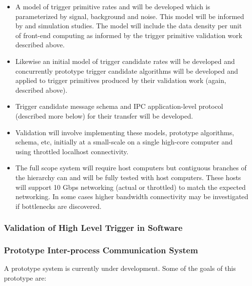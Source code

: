 \begin{itemize}
\item A model of trigger primitive rates and will be developed which is parameterized by signal, background and noise.  This model will be informed by  and simulation studies.  The model will include the data density per unit of front-end computing as informed by the trigger primitive validation work described above.
\item Likewise an initial model of trigger candidate rates will be developed and concurrently prototype trigger candidate algorithms will be developed and applied to trigger primitives produced by their validation work (again, described above).
\item Trigger candidate message schema and IPC application-level protocol (described more below) for their transfer will be developed.
\item Validation will involve implementing these models, prototype algorithms, schema, etc,  initially at a small-scale on a single high-core computer and using throttled localhost connectivity.
\item The full scope system will require  host computers but contiguous branches of the hierarchy can and will be fully tested with  host computers. 
  These hosts will support 10 Gbps networking (actual or throttled) to match the expected networking. 
  In some cases higher bandwidth connectivity may be investigated if bottlenecks are discovered. 
\end{itemize}



\subsubsection{Validation of High Level Trigger in Software}


\subsubsection{Prototype Inter-process Communication System}
\label{sec:fd-daq:validation-demonstrators}

A prototype  system is currently under development. 
Some of the goals of this prototype are:

